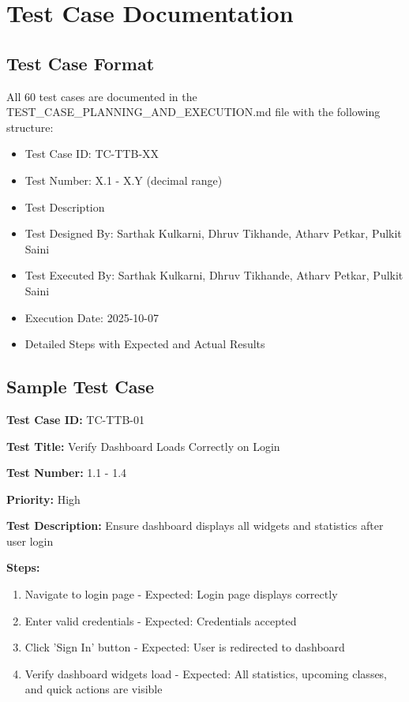 \documentclass[12pt,a4paper]{report}
\begin{document}
\appendix

\chapter{Test Case Documentation}

\section{Test Case Format}
All 60 test cases are documented in the TEST\_CASE\_PLANNING\_AND\_EXECUTION.md file with the following structure:
\begin{itemize}[leftmargin=*]
    \item Test Case ID: TC-TTB-XX
    \item Test Number: X.1 - X.Y (decimal range)
    \item Test Description
    \item Test Designed By: Sarthak Kulkarni, Dhruv Tikhande, Atharv Petkar, Pulkit Saini
    \item Test Executed By: Sarthak Kulkarni, Dhruv Tikhande, Atharv Petkar, Pulkit Saini
    \item Execution Date: 2025-10-07
    \item Detailed Steps with Expected and Actual Results
\end{itemize}

\section{Sample Test Case}
\textbf{Test Case ID:} TC-TTB-01

\textbf{Test Title:} Verify Dashboard Loads Correctly on Login

\textbf{Test Number:} 1.1 - 1.4

\textbf{Priority:} High

\textbf{Test Description:} Ensure dashboard displays all widgets and statistics after user login

\textbf{Steps:}
\begin{enumerate}
    \item Navigate to login page - Expected: Login page displays correctly
    \item Enter valid credentials - Expected: Credentials accepted
    \item Click 'Sign In' button - Expected: User is redirected to dashboard
    \item Verify dashboard widgets load - Expected: All statistics, upcoming classes, and quick actions are visible
\end{enumerate}
\end{document}
